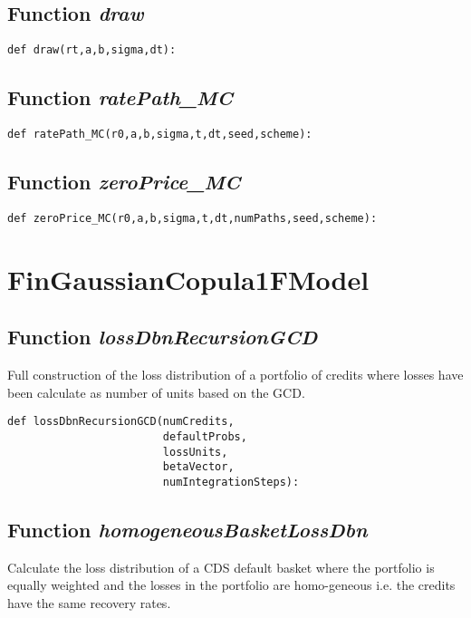 \documentclass[twoside,11pt]{book}
\begin{document}
\subsection{Function {\it draw}}


\begin{lstlisting}
def draw(rt,a,b,sigma,dt):
\end{lstlisting}

\subsection{Function {\it ratePath\_MC}}


\begin{lstlisting}
def ratePath_MC(r0,a,b,sigma,t,dt,seed,scheme):
\end{lstlisting}

\subsection{Function {\it zeroPrice\_MC}}


\begin{lstlisting}
def zeroPrice_MC(r0,a,b,sigma,t,dt,numPaths,seed,scheme):
\end{lstlisting}

\newpage
\section{FinGaussianCopula1FModel}

\subsection{Function {\it lossDbnRecursionGCD}}
Full construction of the loss distribution of a portfolio of credits where losses have been calculate as number of units based on the GCD. 

\begin{lstlisting}
def lossDbnRecursionGCD(numCredits, 
                        defaultProbs, 
                        lossUnits,
                        betaVector,
                        numIntegrationSteps):
\end{lstlisting}

\subsection{Function {\it homogeneousBasketLossDbn}}
Calculate the loss distribution of a CDS default basket where the portfolio is equally weighted and the losses in the portfolio are homo-geneous i.e. the credits have the same recovery rates. 
\end{document}
